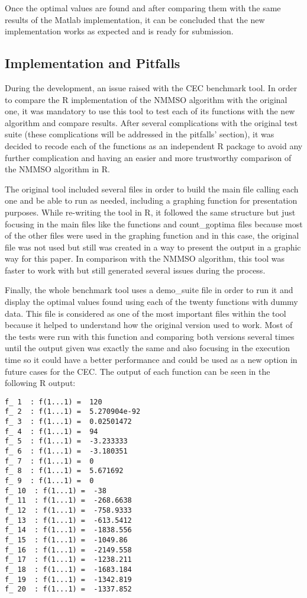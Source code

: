 \documentclass[12pt,a4paper]{article}
\begin{document}
Once the optimal values are found and after comparing them with the same
results of the Matlab implementation, it can be concluded that the new
implementation works as expected and is ready for submission.

\subsection{Implementation and
Pitfalls}\label{implementation-and-pitfalls}

During the development, an issue raised with the CEC benchmark tool. In
order to compare the R implementation of the NMMSO algorithm with the
original one, it was mandatory to use this tool to test each of its
functions with the new algorithm and compare results. After several
complications with the original test suite (these complications will be
addressed in the pitfalls' section), it was decided to recode each of
the functions as an independent R package to avoid any further
complication and having an easier and more trustworthy comparison of the
NMMSO algorithm in R.

The original tool included several files in order to build the main file
calling each one and be able to run as needed, including a graphing
function for presentation purposes. While re-writing the tool in R, it
followed the same structure but just focusing in the main files like the
functions and count\_goptima files because most of the other files were
used in the graphing function and in this case, the original file was
not used but still was created in a way to present the output in a
graphic way for this paper. In comparison with the NMMSO algorithm, this
tool was faster to work with but still generated several issues during
the process.

Finally, the whole benchmark tool uses a demo\_suite file in order to
run it and display the optimal values found using each of the twenty
functions with dummy data. This file is considered as one of the most
important files within the tool because it helped to understand how the
original version used to work. Most of the tests were run with this
function and comparing both versions several times until the output
given was exactly the same and also focusing in the execution time so it
could have a better performance and could be used as a new option in
future cases for the CEC. The output of each function can be seen in the
following R output: \newpage    

\begin{verbatim}
f_ 1  : f(1...1) =  120 
f_ 2  : f(1...1) =  5.270904e-92 
f_ 3  : f(1...1) =  0.02501472 
f_ 4  : f(1...1) =  94 
f_ 5  : f(1...1) =  -3.233333 
f_ 6  : f(1...1) =  -3.180351 
f_ 7  : f(1...1) =  0 
f_ 8  : f(1...1) =  5.671692 
f_ 9  : f(1...1) =  0 
f_ 10  : f(1...1) =  -38 
f_ 11  : f(1...1) =  -268.6638 
f_ 12  : f(1...1) =  -758.9333 
f_ 13  : f(1...1) =  -613.5412 
f_ 14  : f(1...1) =  -1838.556 
f_ 15  : f(1...1) =  -1049.86 
f_ 16  : f(1...1) =  -2149.558 
f_ 17  : f(1...1) =  -1238.211 
f_ 18  : f(1...1) =  -1683.184 
f_ 19  : f(1...1) =  -1342.819 
f_ 20  : f(1...1) =  -1337.852 
\end{verbatim}
\end{document}
